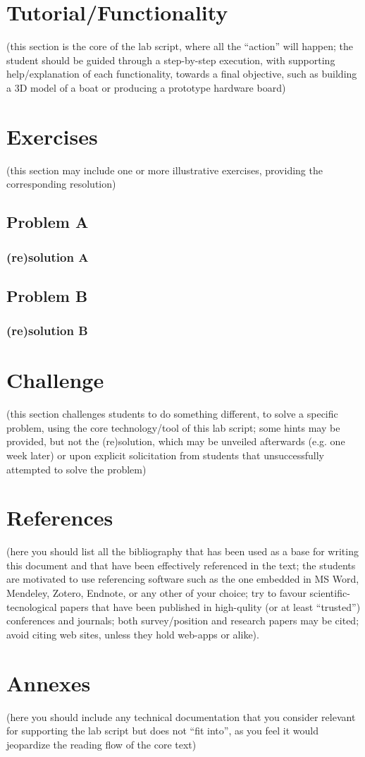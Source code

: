 \documentclass{article}
\begin{document}
\section{Tutorial/Functionality}
(this section is the core of the lab script, where all the “action” will happen; the student should be guided through a step-by-step execution, with supporting help/explanation of each functionality, towards a final objective, such as building a 3D model of a boat or producing a prototype hardware board)
\section{Exercises}
(this section may include one or more illustrative exercises, providing the corresponding resolution)
\subsection{Problem A}
\subsubsection{(re)solution A}
\subsection{Problem B}
\subsubsection{(re)solution B}
\section{Challenge}
(this section challenges students to do something different, to solve a specific problem, using the core technology/tool of this lab script; some hints may be provided, but not the (re)solution, which may be unveiled afterwards (e.g. one week later) or upon explicit solicitation from students that unsuccessfully attempted to solve the problem)
\section{References}
(here you should list all the bibliography that has been used as a base for writing this document and that have been effectively referenced in the text; the students are motivated to use referencing software such as the one embedded in MS Word, Mendeley, Zotero, Endnote, or any other of your choice; try to favour scientific-tecnological papers that have been published in high-qulity (or at least “trusted”) conferences and journals; both survey/position and research papers may be cited; avoid citing web sites, unless they hold web-apps or alike).
\section{Annexes}
(here you should include any technical documentation that you consider relevant for supporting the lab script but does not “fit into”, as you feel it would jeopardize the reading flow of the core text)
\end{document}
